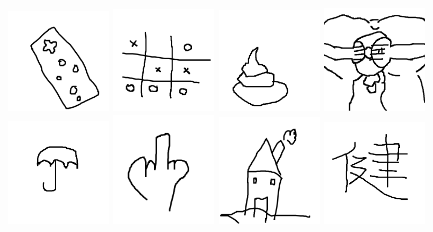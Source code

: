 \includegraphics[width=0.2\textwidth]{art/Safari_68.png}
\includegraphics[width=0.2\textwidth]{art/Safari_69.png}
\includegraphics[width=0.2\textwidth]{art/Safari_7.png}
\includegraphics[width=0.2\textwidth]{art/Safari_70.png}
\includegraphics[width=0.2\textwidth]{art/Safari_71.png}
\includegraphics[width=0.2\textwidth]{art/Safari_72.png}
\includegraphics[width=0.2\textwidth]{art/Safari_73.png}
\includegraphics[width=0.2\textwidth]{art/Safari_74.png}
